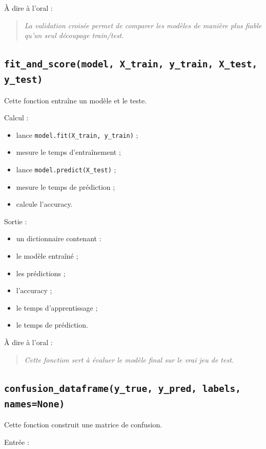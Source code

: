 \documentclass[11pt,a4paper]{article}
\begin{document}
À dire à l'oral :

\begin{quote}
\itshape La validation croisée permet de comparer les modèles de manière plus fiable qu'un seul découpage train/test.
\end{quote}

\subsection{\texttt{fit\_and\_score(model, X\_train, y\_train, X\_test, y\_test)}}

Cette fonction entraîne un modèle et le teste.

Calcul :

\begin{itemize}
\item lance \texttt{model.fit(X\_train, y\_train)} ;
\item mesure le temps d'entraînement ;
\item lance \texttt{model.predict(X\_test)} ;
\item mesure le temps de prédiction ;
\item calcule l'accuracy.
\end{itemize}

Sortie :

\begin{itemize}
\item un dictionnaire contenant :
\item le modèle entraîné ;
\item les prédictions ;
\item l'accuracy ;
\item le temps d'apprentissage ;
\item le temps de prédiction.
\end{itemize}

À dire à l'oral :

\begin{quote}
\itshape Cette fonction sert à évaluer le modèle final sur le vrai jeu de test.
\end{quote}

\subsection{\texttt{confusion\_dataframe(y\_true, y\_pred, labels, names=None)}}

Cette fonction construit une matrice de confusion.

Entrée :
\end{document}
